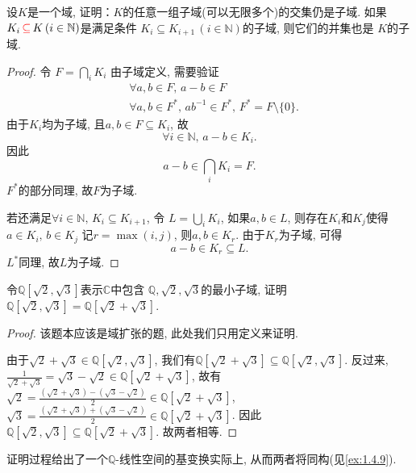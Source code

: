\begin{problem}
    设$K$是一个域, 证明：$K$的任意一组子域(可以无限多个)的交集仍是子域.
如果$K_i \,\textcolor{red}{\subseteq}\, K \, (i \in \mathbb{N})$是满足条件
$K_i \subseteq K_{i+1} \, (i \in \mathbb{N})$的子域, 则它们的并集也是
$K$的子域.
\end{problem}

\begin{proof}
    令
\(
    F = \bigcap_i K_i
\)
    由子域定义, 需要验证
\[
\begin{aligned}
    &\forall a, b \in F ,\, a - b \in F\\
    &\forall a, b \in F^* ,\, ab^{-1} \in F^*,\, F^* = F \setminus \{0\}.
\end{aligned}
\]
由于$K_i$均为子域, 且$a, b \in F \subseteq K_i$, 故
\[
    \forall i \in \mathbb{N}, \, a - b \in K_i.
\]
因此
\[
    a - b \in \bigcap_i K_i = F.
\]
$F^*$的部分同理, 故$F$为子域.

若还满足$\forall i \in \mathbb{N} ,\, K_i \subseteq K_{i + 1}$,
令
\(
    L = \bigcup_i K_i
\),
如果$a, b \in L$, 则存在$K_i$和$K_j$使得$a \in K_i ,\, b \in K_j$
记$r = \max(i, j)$, 则$a, b \in K_r$. 由于$K_r$为子域, 可得
\[
    a - b \in K_r \subseteq L.
\]
$L^*$同理, 故$L$为子域.
\end{proof}

\begin{problem}
    令$\mathbb{Q}[\sqrt{2}, \sqrt{3}]$表示$\mathbb{C}$中包含
$\mathbb{Q}, \sqrt{2}, \sqrt{3}$的最小子域, 证明
$\mathbb{Q}[\sqrt{2}, \sqrt{3}] = \mathbb{Q}[\sqrt{2} + \sqrt{3}]$.
\end{problem}

\begin{proof}
    该题本应该是域扩张的题, 此处我们只用定义来证明.

    由于$\sqrt{2} + \sqrt{3} \in \mathbb{Q}[\sqrt{2}, \sqrt{3}]$,
我们有$\mathbb{Q}[\sqrt{2} + \sqrt{3}] \subseteq \mathbb{Q}[\sqrt{2}, \sqrt{3}]$.
反过来, 
\(
    \frac{1}{\sqrt{2} + \sqrt{3}} = \sqrt{3} - \sqrt{2} \in \mathbb{Q}[\sqrt{2} + \sqrt{3}]
\),
故有
\(
    \sqrt{2} = \frac{(\sqrt{2} + \sqrt{3}) - (\sqrt{3} - \sqrt{2})}{2} \in \mathbb{Q}[\sqrt{2} + \sqrt{3}]
\),
\(
    \sqrt{3} = \frac{(\sqrt{2} + \sqrt{3}) + (\sqrt{3} - \sqrt{2})}{2} \in \mathbb{Q}[\sqrt{2} + \sqrt{3}]
\).
因此
\(
    \mathbb{Q}[\sqrt{2}, \sqrt{3}] \subseteq \mathbb{Q}[\sqrt{2} + \sqrt{3}]
\).
故两者相等.
\end{proof}

\begin{remark}
    证明过程给出了一个$\mathbb{Q}$-线性空间的基变换实际上, 从而两者将同构(见\ref{ex:1.4.9}).
\end{remark}

